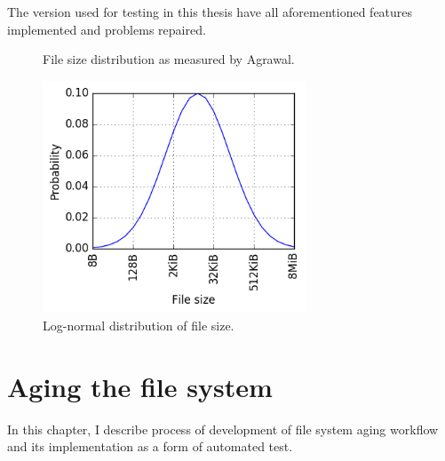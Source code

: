 \documentclass[
  color, %
  table, %
  lof,   %
  lot,   %
]{fithesis3}
\begin{document}
The version used for testing in this thesis have all aforementioned features implemented and problems repaired.

\begin{figure}
    \centering
    \caption{File size distribution as measured by Agrawal.~\cite{agrawal2007five}}
    \label{fig:filedist}
\end{figure}

\begin{figure}%
    \begin{minipage}{\textwidth}
        \centering
        \includegraphics[width=0.7\textwidth]{../scripts/dist3.png}
        \caption{Log-normal distribution of file size.}
\label{fig:lognormal}
    \end{minipage}
\end{figure}



\chapter{Aging the file system}
\label{aging}
In this chapter, I describe process of development of file system aging workflow and its implementation as a form of automated test.
\end{document}
